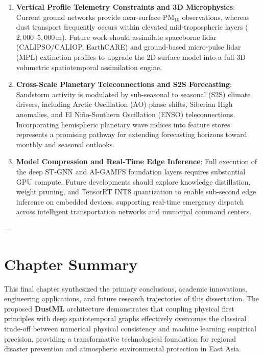 \begin{enumerate}
    \item \textbf{Vertical Profile Telemetry Constraints and 3D Microphysics}: Current ground networks provide near-surface $\text{PM}_{10}$ observations, whereas dust transport frequently occurs within elevated mid-tropospheric layers ($2{,}000\text{--}5{,}000\,\text{m}$). Future work should assimilate spaceborne lidar (CALIPSO/CALIOP, EarthCARE) and ground-based micro-pulse lidar (MPL) extinction profiles to upgrade the 2D surface model into a full 3D volumetric spatiotemporal assimilation engine.
    \item \textbf{Cross-Scale Planetary Teleconnections and S2S Forecasting}: Sandstorm activity is modulated by sub-seasonal to seasonal (S2S) climate drivers, including Arctic Oscillation (AO) phase shifts, Siberian High anomalies, and El Ni\~no-Southern Oscillation (ENSO) teleconnections. Incorporating hemispheric planetary wave indices into feature stores represents a promising pathway for extending forecasting horizons toward monthly and seasonal outlooks.
    \item \textbf{Model Compression and Real-Time Edge Inference}: Full execution of the deep ST-GNN and AI-GAMFS foundation layers requires substantial GPU compute. Future developments should explore knowledge distillation, weight pruning, and TensorRT INT8 quantization to enable sub-second edge inference on embedded devices, supporting real-time emergency dispatch across intelligent transportation networks and municipal command centers.
\end{enumerate}

---

\section{Chapter Summary}
\label{sec:ch7_summary}

This final chapter synthesized the primary conclusions, academic innovations, engineering applications, and future research trajectories of this dissertation. The proposed \textbf{DustML} architecture demonstrates that coupling physical first principles with deep spatiotemporal graphs effectively overcomes the classical trade-off between numerical physical consistency and machine learning empirical precision, providing a transformative technological foundation for regional disaster prevention and atmospheric environmental protection in East Asia.
